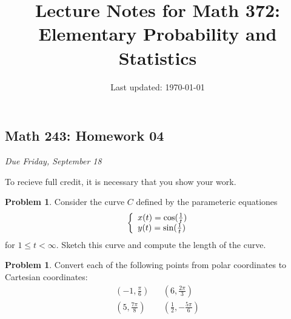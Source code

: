\documentclass[10pt]{article}
\title{Lecture Notes for Math 372: \\Elementary Probability and Statistics}
\date{Last updated: \today}
\theoremstyle{definition}
\newtheorem{problem}[theorem]{Problem}
\newcommand{\vt}{\vskip 5mm} %
\newcommand{\Fl}{\vt\noindent\textbf} %
\newcommand{\1}[1]{\textbf{1}_{\left[#1\right]}} %
\begin{document}
\begin{center}
  \section*{Math 243: Homework 04}
  \textit{Due Friday, September 18}
\end{center}

To recieve full credit, it is necessary that you show your work.

\begin{problem} Consider the curve $C$ defined by the parameteric equationes
  \begin{equation*}
    \left\{ \begin{array}{l@{}l} x(t) = \cos(\frac{1}{t}) \\ y(t) = \sin( \frac{1}{t}) \end{array}\right.
  \end{equation*}
  for $1 \leq t <\infty$. Sketch this curve and compute the length of the curve.



\end{problem}


\begin{problem}
  Convert each of the following points from polar coordinates to Cartesian coordinates:
  \begin{align*}
    \left(-1,\frac\pi6\right)&&\left(6,\frac{2\pi}{3}\right)\\
    \left(5,\frac{7\pi}{8}\right)&&\left(\frac12,-\frac{5\pi}{6}\right)
  \end{align*}
\end{problem}
\end{document}
